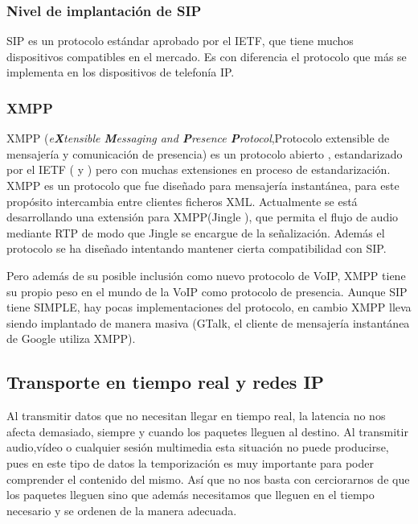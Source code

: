 \subsubsection{Nivel de implantación de SIP}
\label{sec:implantacion-de-sip}

SIP es un protocolo estándar aprobado por el IETF, que tiene muchos dispositivos compatibles en el mercado. Es con diferencia el protocolo que más se implementa en los dispositivos de telefonía IP.


\subsubsection{XMPP}
\label{sec:xmpp}

XMPP (\emph{e\textbf{X}tensible \textbf{M}essaging and \textbf{P}resence \textbf{P}rotocol},Protocolo extensible de mensajería y comunicación de presencia) es un protocolo abierto , estandarizado por el IETF (\cite{rfc3920} \cite{rfc3921} y \cite{rfc3922}) pero con muchas extensiones en proceso de estandarización. XMPP es un protocolo que fue diseñado para mensajería instantánea, para este propósito intercambia entre clientes ficheros XML. Actualmente se está desarrollando una extensión para XMPP(Jingle \cite{jingle-overview}), que permita el flujo de audio mediante RTP de modo que Jingle se encargue de la señalización. Además el protocolo se ha diseñado intentando mantener cierta compatibilidad con SIP.

Pero además de su posible inclusión como nuevo protocolo de VoIP, XMPP tiene su propio peso en el mundo de la VoIP como protocolo de presencia. Aunque SIP tiene SIMPLE, hay pocas implementaciones del protocolo, en cambio XMPP lleva siendo implantado de manera masiva (GTalk, el cliente de mensajería instantánea de Google utiliza XMPP). 

\subsection{Transporte en tiempo real y redes IP}
\label{sec:transporte-en-tiempo}

Al transmitir datos que no necesitan llegar en tiempo real, la latencia no nos afecta demasiado, siempre y cuando los paquetes lleguen al destino. Al transmitir audio,vídeo o cualquier sesión multimedia esta situación no puede producirse, pues en este tipo de datos la temporización es muy importante para poder comprender el contenido del mismo. Así que no nos basta con cerciorarnos de que los paquetes lleguen sino que además necesitamos que lleguen en el tiempo necesario y se ordenen de la manera adecuada.


